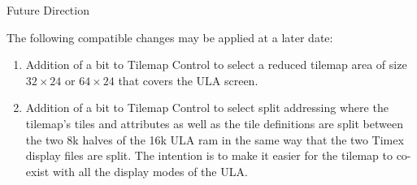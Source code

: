 Future Direction

The following compatible changes may be applied at a later date:

\begin{enumerate}
\item Addition of a bit to Tilemap Control to select a reduced tilemap
  area of size $32\times24$ or $64\times24$ that covers the ULA
  screen.
\item Addition of a bit to Tilemap Control to select split addressing
  where the tilemap’s tiles and attributes as well as the tile
  definitions are split between the two 8k halves of the 16k ULA ram
  in the same way that the two Timex display files are split. The
  intention is to make it easier for the tilemap to co-exist with all
  the display modes of the ULA.
\end{enumerate}
